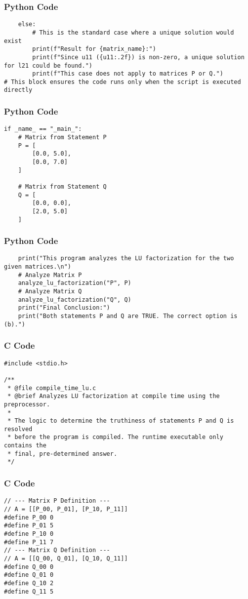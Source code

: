 \documentclass{beamer}
\begin{document}
\begin{frame}[fragile]
\frametitle{Python Code}
\begin{lstlisting}
    else:
        # This is the standard case where a unique solution would exist
        print(f"Result for {matrix_name}:")
        print(f"Since u11 ({u11:.2f}) is non-zero, a unique solution for l21 could be found.")
        print(f"This case does not apply to matrices P or Q.")
# This block ensures the code runs only when the script is executed directly
\end{lstlisting}
\end{frame}

\begin{frame}[fragile]
\frametitle{Python Code}
\begin{lstlisting}
if _name_ == "_main_":
    # Matrix from Statement P
    P = [
        [0.0, 5.0],
        [0.0, 7.0]
    ]

    # Matrix from Statement Q
    Q = [
        [0.0, 0.0],
        [2.0, 5.0]
    ]
\end{lstlisting}
\end{frame}

\begin{frame}[fragile]
\frametitle{Python Code}
\begin{lstlisting} 
    print("This program analyzes the LU factorization for the two given matrices.\n")
    # Analyze Matrix P
    analyze_lu_factorization("P", P)
    # Analyze Matrix Q
    analyze_lu_factorization("Q", Q)
    print("Final Conclusion:")
    print("Both statements P and Q are TRUE. The correct option is (b).")
\end{lstlisting}
\end{frame}

\begin{frame}[fragile]
\frametitle{C Code}
\begin{lstlisting}
#include <stdio.h>

/**
 * @file compile_time_lu.c
 * @brief Analyzes LU factorization at compile time using the preprocessor.
 *
 * The logic to determine the truthiness of statements P and Q is resolved
 * before the program is compiled. The runtime executable only contains the
 * final, pre-determined answer.
 */
\end{lstlisting}
\end{frame}

\begin{frame}[fragile]
\frametitle{C Code}
\begin{lstlisting}
// --- Matrix P Definition ---
// A = [[P_00, P_01], [P_10, P_11]]
#define P_00 0
#define P_01 5
#define P_10 0
#define P_11 7
// --- Matrix Q Definition ---
// A = [[Q_00, Q_01], [Q_10, Q_11]]
#define Q_00 0
#define Q_01 0
#define Q_10 2
#define Q_11 5
\end{lstlisting}
\end{frame}
\end{document}
